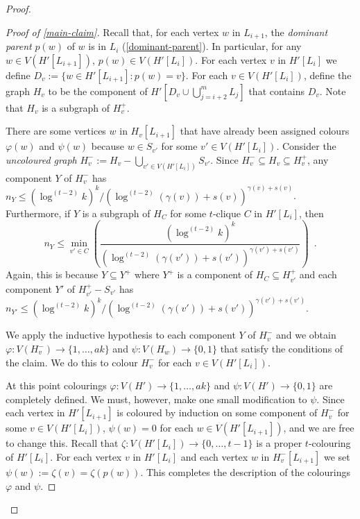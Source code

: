 \documentclass[kpfonts]{patmorin}
\theoremstyle{named}
\begin{document}
\begin{proof}
\begin{proof}[Proof of \cref{main-claim}]
       Recall that, for each vertex $w$ in $L_{i+1}$, the \emph{dominant parent} $p(w)$ of $w$ is in $L_i$ (\cref{dominant-parent}).  In particular, for any $w\in V(H'[L_{i+1}])$, $p(w)\in V(H'[L_{i}])$.
       For each vertex $v$ in $H'[L_i]$ we define $D_v:=\{w\in H'[L_{i+1}]: p(w)=v\}$.  For each $v\in V(H'[L_i])$, define the graph $H_v$ to be the component of $H'[D_v\cup \bigcup_{j=i+2}^m L_j]$ that contains $D_v$.  Note that $H_v$ is a subgraph of $H^+_v$.

       There are some vertices $w$ in $H_v[L_{i+1}]$ that have already been assigned colours $\varphi(w)$ and $\psi(w)$ because $w\in S_{v'}$ for some $v'\in V(H'[L_i])$.  Consider the \emph{uncoloured graph} $H^-_v:=H_v-\bigcup_{v'\in V(H'[L_i])} S_{v'}$.  Since $H^-_v\subseteq H_v\subseteq H^+_v$, any component $Y$ of $H^-_v$ has $n_Y\le (\log^{(t-2)} k)^k/(\log^{(t-2)} (\gamma(v))+s(v))^{\gamma(v)+s(v)}$.  Furthermore, if $Y$ is a subgraph of $H_C$ for some $t$-clique $C$ in $H'[L_i]$, then
       \begin{equation}
        n_Y \le \min_{v'\in C}\left(\frac{(\log^{(t-2)}k)^k}{(\log^{(t-2)} (\gamma(v'))+s(v'))^{\gamma(v')+s(v')}} \right) \enspace . \label{min}
        \end{equation}
       Again, this is because $Y\subseteq Y^+$ where $Y^+$ is a component of $H_C\subseteq H^+_{v'}$ and each component $Y'$ of $H^+_{v'}-S_{v'}$ has $n_{Y'}\le (\log^{(t-2)}k)^k/(\log^{(t-2)} (\gamma(v'))+s(v'))^{\gamma(v')+s(v')}$.

       We apply the inductive hypothesis to each component $Y$ of $H^-_v$ and we obtain $\varphi:V(H^-_v)\to\{1,\ldots,ak\}$ and $\psi:V(H_w)\to\{0,1\}$ that satisfy the conditions of the claim.  We do this to colour $H^-_v$ for each $v\in V(H'[L_i])$.

       At this point colourings $\varphi:V(H')\to\{1,\ldots,ak\}$ and $\psi:V(H')\to\{0,1\}$ are completely defined.  We must, however, make one small modification to $\psi$.  Since each vertex in $H'[L_{i+1}]$ is coloured by induction on some component of $H^-_v$ for some $v\in V(H'[L_i])$, $\psi(w)=0$ for each $w\in V(H'[L_{i+1}])$, and we are free to change this.
       Recall that $\zeta:V(H'[L_i])\to\{0,\ldots,t-1\}$ is a proper $t$-colouring of $H'[L_i]$.  For each vertex $v$ in $H'[L_i]$ and each vertex $w$ in $H^-_v[L_{i+1}]$ we set $\psi(w):=\zeta(v)=\zeta(p(w))$.  This completes the description of the colourings $\varphi$ and $\psi$.


\end{proof}
\end{proof}
\end{document}
